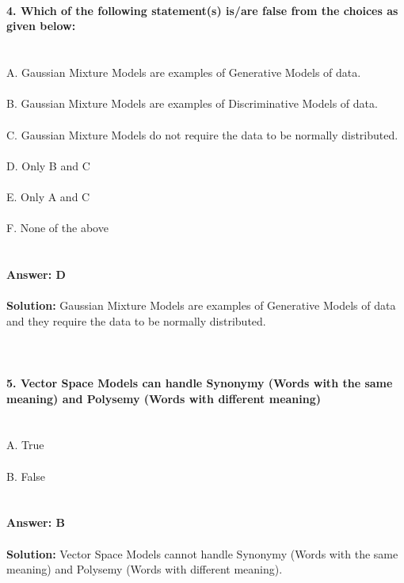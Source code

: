 \documentclass[prl,twocolumn,showpacs,preprintnumbers,superscriptaddress]{revtex4}
\theoremstyle{plain}
\theoremstyle{definition}
\begin{document}
\begin{widetext}
\\
\\
\\
\textbf{4. Which of the following statement(s) is/are false from the choices as given below:}
\\
\\
\\
\noindent A. Gaussian Mixture Models are examples of Generative Models of data.
\\
\\
B. Gaussian Mixture Models are examples of Discriminative Models of data.
\\
\\
C. Gaussian Mixture Models do not require the data to be normally distributed.
\\
\\
D. Only B and C 
\\
\\
E. Only A and C 
\\
\\
F. None of the above
\\
\\
\\
\textbf{Answer: D}
\\
\\
\textbf{Solution:} Gaussian Mixture Models are examples of Generative Models of data and they require the data to be normally distributed.
\\
\\
\\
\\
\textbf{5. Vector Space Models can handle Synonymy (Words with the same meaning) and Polysemy (Words with different meaning)}
\\
\\
\\
A. True
\\
\\
B. False
\\
\\
\\
\textbf{Answer: B}
\\
\\
\textbf{Solution:} Vector Space Models cannot handle Synonymy (Words with the same meaning) and Polysemy (Words with different meaning).
\end{widetext}
\end{document}
